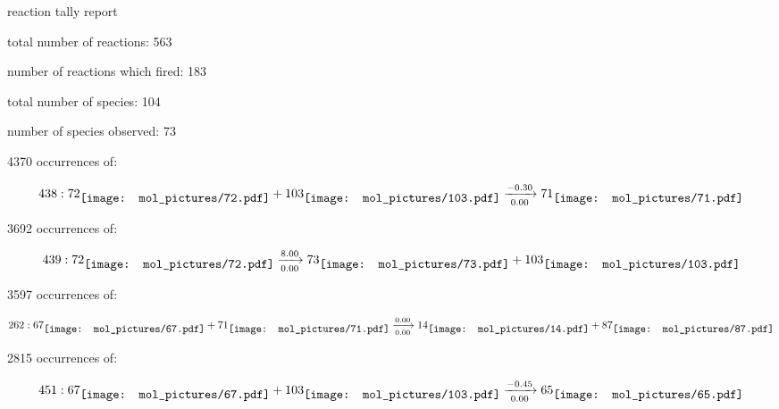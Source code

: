 \documentclass{article}
\begin{document}
\setlength\parindent{0pt}


reaction tally report



total number of reactions: 563



number of reactions which fired: 183



total number of species: 104



number of species observed: 73



4370 occurrences of:

$$
438:  
72
\raisebox{-.5\height}{\texttt{[image: mol\_pictures/72.pdf]}}
+
103
\raisebox{-.5\height}{\texttt{[image: mol\_pictures/103.pdf]}}
\xrightarrow[0.00]{-0.30}
71
\raisebox{-.5\height}{\texttt{[image: mol\_pictures/71.pdf]}}
$$



\vspace{1cm}


3692 occurrences of:

$$
439:  
72
\raisebox{-.5\height}{\texttt{[image: mol\_pictures/72.pdf]}}
\xrightarrow[0.00]{8.00}
73
\raisebox{-.5\height}{\texttt{[image: mol\_pictures/73.pdf]}}
+
103
\raisebox{-.5\height}{\texttt{[image: mol\_pictures/103.pdf]}}
$$



\vspace{1cm}


3597 occurrences of:

$$
262:  
67
\raisebox{-.5\height}{\texttt{[image: mol\_pictures/67.pdf]}}
+
71
\raisebox{-.5\height}{\texttt{[image: mol\_pictures/71.pdf]}}
\xrightarrow[0.00]{0.00}
14
\raisebox{-.5\height}{\texttt{[image: mol\_pictures/14.pdf]}}
+
87
\raisebox{-.5\height}{\texttt{[image: mol\_pictures/87.pdf]}}
$$



\vspace{1cm}


2815 occurrences of:

$$
451:  
67
\raisebox{-.5\height}{\texttt{[image: mol\_pictures/67.pdf]}}
+
103
\raisebox{-.5\height}{\texttt{[image: mol\_pictures/103.pdf]}}
\xrightarrow[0.00]{-0.45}
65
\raisebox{-.5\height}{\texttt{[image: mol\_pictures/65.pdf]}}
$$
\end{document}
